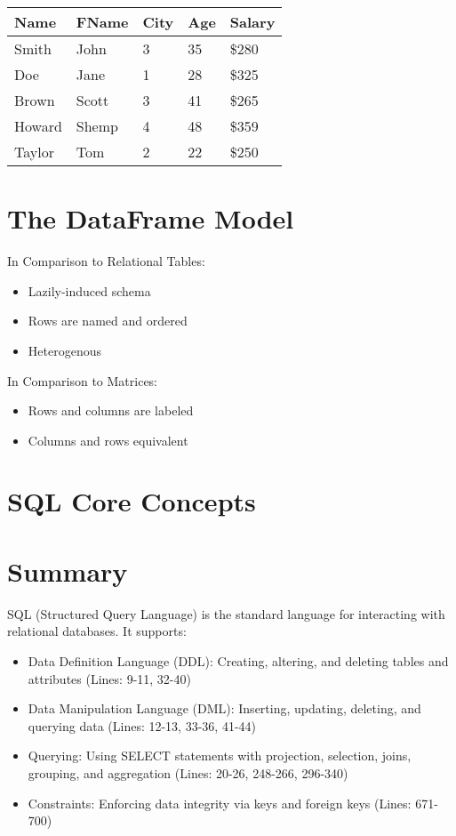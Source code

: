\documentclass{article}
\begin{document}
\begin{tabular}{lllll}
\hline
Name & FName & City & Age & Salary \\
\hline
Smith & John & 3 & 35 & \$280 \\
Doe & Jane & 1 & 28 & \$325 \\
Brown & Scott & 3 & 41 & \$265 \\
Howard & Shemp & 4 & 48 & \$359 \\
Taylor & Tom & 2 & 22 & \$250 \\
\hline
\end{tabular}

\section*{The DataFrame Model}

In Comparison to Relational Tables:

\begin{itemize}
    \item Lazily-induced schema
    \item Rows are named and ordered
    \item Heterogenous
\end{itemize}

In Comparison to Matrices:

\begin{itemize}
    \item Rows and columns are labeled
    \item Columns and rows equivalent
\end{itemize}

\section*{SQL Core Concepts}

\section*{Summary}
SQL (Structured Query Language) is the standard language for interacting with relational databases. It supports:
\begin{itemize}
    \item Data Definition Language (DDL): Creating, altering, and deleting tables and attributes (Lines: 9-11, 32-40)
    \item Data Manipulation Language (DML): Inserting, updating, deleting, and querying data (Lines: 12-13, 33-36, 41-44)
    \item Querying: Using SELECT statements with projection, selection, joins, grouping, and aggregation (Lines: 20-26, 248-266, 296-340)
    \item Constraints: Enforcing data integrity via keys and foreign keys (Lines: 671-700)
\end{itemize}
\end{document}

